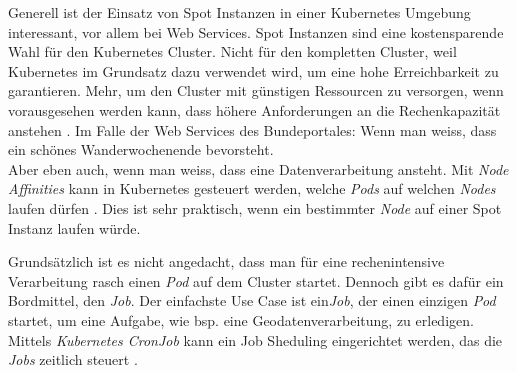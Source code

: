 Generell ist der Einsatz von Spot Instanzen in einer Kubernetes Umgebung interessant, vor allem bei Web Services. Spot Instanzen sind eine kostensparende Wahl für den Kubernetes Cluster. Nicht für den kompletten Cluster, weil Kubernetes im Grundsatz dazu verwendet wird, um eine hohe Erreichbarkeit zu garantieren. Mehr, um den Cluster mit günstigen Ressourcen zu versorgen, wenn vorausgesehen werden kann, dass höhere Anforderungen an die Rechenkapazität anstehen \autocite[89]{CloudNativ:1}. Im Falle der Web Services des Bundeportales: Wenn man weiss, dass ein schönes Wanderwochenende bevorsteht.\\Aber eben auch, wenn man weiss, dass eine Datenverarbeitung ansteht.
Mit \emph{Node Affinities} kann in Kubernetes gesteuert werden, welche \emph{Pods} auf welchen \emph{Nodes} laufen dürfen \autocite[159]{CloudNativ:1}. Dies ist sehr praktisch, wenn ein bestimmter \emph{Node} auf einer Spot Instanz laufen würde.

Grundsätzlich ist es nicht angedacht, dass man für eine rechenintensive Verarbeitung rasch einen \emph{Pod} auf dem Cluster startet. Dennoch gibt es dafür ein Bordmittel, den \emph{Job}. Der einfachste Use Case ist ein\emph{Job}, der einen einzigen \emph{Pod} startet, um eine Aufgabe, wie bsp. eine Geodatenverarbeitung, zu erledigen. Mittels \emph{Kubernetes CronJob} kann ein Job Sheduling eingerichtet werden, das die \emph{Jobs} zeitlich steuert \cite{9781788390071}.
